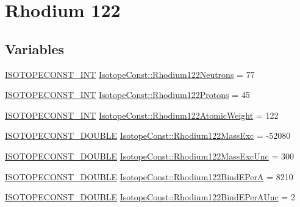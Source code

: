 \hypertarget{group___isotope_const-_rhodium-_rh122}{}\section{Rhodium 122}
\label{group___isotope_const-_rhodium-_rh122}
\subsection*{Variables}
\begin{DoxyCompactItemize}
\item 
\mbox{\hyperlink{group___isotope_const-_macros_ga5f18360b3e99483a35c32d789e62621c}{I\+S\+O\+T\+O\+P\+E\+C\+O\+N\+S\+T\+\_\+\+I\+NT}} \mbox{\hyperlink{group___isotope_const-_rhodium-_rh122_ga57e0713ac5eec532431b609a226f7a5e}{Isotope\+Const\+::\+Rhodium122\+Neutrons}} = 77
\item 
\mbox{\hyperlink{group___isotope_const-_macros_ga5f18360b3e99483a35c32d789e62621c}{I\+S\+O\+T\+O\+P\+E\+C\+O\+N\+S\+T\+\_\+\+I\+NT}} \mbox{\hyperlink{group___isotope_const-_rhodium-_rh122_gad749a1d50dc77be6f0e285d9acf1f160}{Isotope\+Const\+::\+Rhodium122\+Protons}} = 45
\item 
\mbox{\hyperlink{group___isotope_const-_macros_ga5f18360b3e99483a35c32d789e62621c}{I\+S\+O\+T\+O\+P\+E\+C\+O\+N\+S\+T\+\_\+\+I\+NT}} \mbox{\hyperlink{group___isotope_const-_rhodium-_rh122_ga071eb80a4f783570efcc66f35d137780}{Isotope\+Const\+::\+Rhodium122\+Atomic\+Weight}} = 122
\item 
\mbox{\hyperlink{group___isotope_const-_macros_ga8f45a7272ce02c0b4c65c44636ed719a}{I\+S\+O\+T\+O\+P\+E\+C\+O\+N\+S\+T\+\_\+\+D\+O\+U\+B\+LE}} \mbox{\hyperlink{group___isotope_const-_rhodium-_rh122_ga3e2a6d65e82b668cab75f11c152acbe8}{Isotope\+Const\+::\+Rhodium122\+Mass\+Exc}} = -\/52080
\item 
\mbox{\hyperlink{group___isotope_const-_macros_ga8f45a7272ce02c0b4c65c44636ed719a}{I\+S\+O\+T\+O\+P\+E\+C\+O\+N\+S\+T\+\_\+\+D\+O\+U\+B\+LE}} \mbox{\hyperlink{group___isotope_const-_rhodium-_rh122_ga0027767f447ed829867d95f5e0539f1e}{Isotope\+Const\+::\+Rhodium122\+Mass\+Exc\+Unc}} = 300
\item 
\mbox{\hyperlink{group___isotope_const-_macros_ga8f45a7272ce02c0b4c65c44636ed719a}{I\+S\+O\+T\+O\+P\+E\+C\+O\+N\+S\+T\+\_\+\+D\+O\+U\+B\+LE}} \mbox{\hyperlink{group___isotope_const-_rhodium-_rh122_ga1c25bc9af10432d8a59587de703e5f10}{Isotope\+Const\+::\+Rhodium122\+Bind\+E\+PerA}} = 8210
\item 
\mbox{\hyperlink{group___isotope_const-_macros_ga8f45a7272ce02c0b4c65c44636ed719a}{I\+S\+O\+T\+O\+P\+E\+C\+O\+N\+S\+T\+\_\+\+D\+O\+U\+B\+LE}} \mbox{\hyperlink{group___isotope_const-_rhodium-_rh122_ga95af8799a7805dabdd6c155962716e19}{Isotope\+Const\+::\+Rhodium122\+Bind\+E\+Per\+A\+Unc}} = 2

\end{DoxyCompactItemize}
